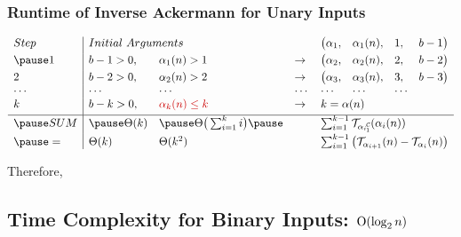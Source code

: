 \begin{frame}
\frametitle{Runtime of Inverse Ackermann for Unary Inputs}

\begin{equation*}
\begin{array}{l|llllllll}
Step & \multicolumn{2}{l}{Initial \ Arguments} &  &  \big(\alpha_1, & \alpha_1(n), & 1, & b - 1 \big) \\[3pt]
\pause 1 & b - 1 > 0, & \alpha_1(n) > 1 & \to & \big(\alpha_2, & \alpha_2(n), & 2, & b - 2\big) \\[3pt]
2 & b - 2 > 0, & \alpha_2(n) > 2 & \to  & \big(\alpha_3, & \alpha_3(n), & 3, & b - 3\big) \\
\cdots & \cdots &\cdots & \cdots & \cdots & \cdots & \cdots \\
k & b - k > 0, & {\color{red} \alpha_{k}(n) \le k} & \to  & \multicolumn{4}{l}{k = \alpha(n)} \\[3pt] \hline
\pause SUM & \pause \Theta(k) & \pause \Theta\big(\sum_{i=1}^{k}i\big) \pause & & \multicolumn{4}{l}{\sum_{i=1}^{k-1} \runtime_{\cdt{\alpha_i}{1}} (\alpha_i(n))} \\[3pt]
\pause = & \Theta(k) & \Theta(k^2) & & \multicolumn{4}{l}{\sum_{i=1}^{k-1} \big(\runtime_{\alpha_{i+1}}(n) - \runtime_{\alpha_i}(n) \big)}
\end{array}
\end{equation*}

\smallskip

\pause
Therefore, 

\end{frame}

\subsection{Time Complexity for Binary Inputs: $\text{O} (\log_2n)$}


